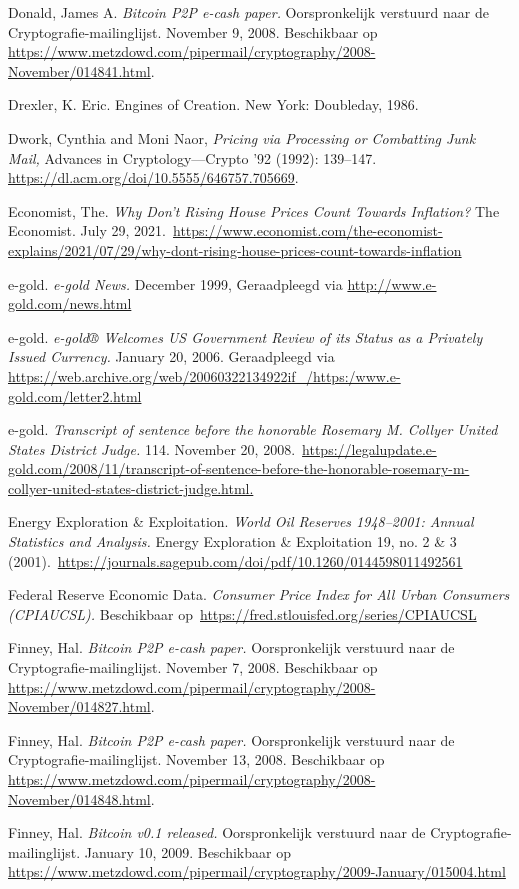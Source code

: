 \documentclass[
  a5paper,
  smalldemyvopaper,11pt,twoside,onecolumn,openright,extrafontsizes,
hidelinks]{memoir}
\begin{document}
Donald, James A. \emph{Bitcoin P2P e-cash paper.} Oorspronkelijk
verstuurd naar de Cryptografie-mailinglijst. November 9, 2008.
Beschikbaar op
\url{https://www.metzdowd.com/pipermail/cryptography/2008-November/014841.html}.

Drexler, K. Eric. Engines of Creation. New York: Doubleday, 1986.

Dwork, Cynthia and Moni Naor, \emph{Pricing via Processing or Combatting
Junk Mail,} Advances in Cryptology---Crypto '92 (1992): 139--147.
\url{https://dl.acm.org/doi/10.5555/646757.705669}.

Economist, The. \emph{Why Don't Rising House Prices Count Towards
Inflation?} The Economist. July 29,
2021.~\url{https://www.economist.com/the-economist-explains/2021/07/29/why-dont-rising-house-prices-count-towards-inflation}

e-gold. \emph{e-gold News.} December 1999, Geraadpleegd via
\url{http://www.e-gold.com/news.html}

e-gold. \emph{e-gold® Welcomes US Government Review of its Status as a
Privately Issued Currency.} January 20, 2006. Geraadpleegd via
\url{https://web.archive.org/web/20060322134922if_/https:/www.e-gold.com/letter2.html}

e-gold. \emph{Transcript of sentence before the honorable Rosemary M.
Collyer United States District Judge.} 114. November 20,
2008.~\url{https://legalupdate.e-gold.com/2008/11/transcript-of-sentence-before-the-honorable-rosemary-m-collyer-united-states-district-judge.html.}

Energy Exploration \& Exploitation. \emph{World Oil Reserves 1948--2001:
Annual Statistics and Analysis.} Energy Exploration \& Exploitation 19,
no. 2 \& 3
(2001).~\url{https://journals.sagepub.com/doi/pdf/10.1260/0144598011492561}

Federal Reserve Economic Data. \emph{Consumer Price Index for All Urban
Consumers (CPIAUCSL).} Beschikbaar
op~\url{https://fred.stlouisfed.org/series/CPIAUCSL}

Finney, Hal. \emph{Bitcoin P2P e-cash paper.} Oorspronkelijk verstuurd
naar de Cryptografie-mailinglijst. November 7, 2008. Beschikbaar op
\url{https://www.metzdowd.com/pipermail/cryptography/2008-November/014827.html}.

Finney, Hal. \emph{Bitcoin P2P e-cash paper.} Oorspronkelijk verstuurd
naar de Cryptografie-mailinglijst. November 13, 2008. Beschikbaar op
\url{https://www.metzdowd.com/pipermail/cryptography/2008-November/014848.html}.

Finney, Hal. \emph{Bitcoin v0.1 released.} Oorspronkelijk verstuurd naar
de Cryptografie-mailinglijst. January 10, 2009. Beschikbaar op
\url{https://www.metzdowd.com/pipermail/cryptography/2009-January/015004.html}
\end{document}
